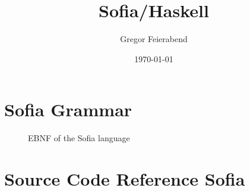 \documentclass[notitlepage]{report}
\title{Sofia/Haskell}
\author{Gregor Feierabend}
\date{\today}
\begin{document}

\maketitle

\begingroup
\let\clearpage\relax
\tableofcontents
\endgroup


\chapter{Sofia Grammar}
\begin{figure}[h!]
	
	\caption{EBNF of the Sofia language}
\end{figure}

\chapter{Source Code Reference Sofia}

\end{document}
